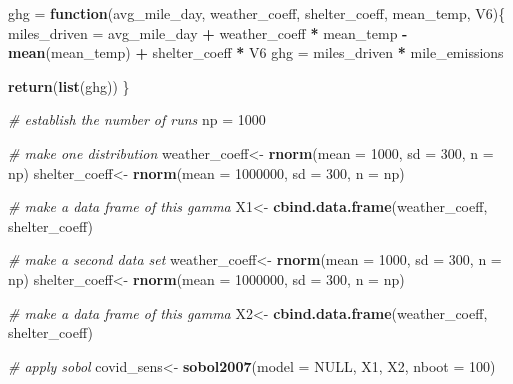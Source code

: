 \documentclass[]{article}
\newenvironment{Shaded}{\begin{snugshade}}{\end{snugshade}}
\newcommand{\KeywordTok}[1]{\textcolor[rgb]{0.13,0.29,0.53}{\textbf{#1}}}
\newcommand{\DataTypeTok}[1]{\textcolor[rgb]{0.13,0.29,0.53}{#1}}
\newcommand{\DecValTok}[1]{\textcolor[rgb]{0.00,0.00,0.81}{#1}}
\newcommand{\StringTok}[1]{\textcolor[rgb]{0.31,0.60,0.02}{#1}}
\newcommand{\CommentTok}[1]{\textcolor[rgb]{0.56,0.35,0.01}{\textit{#1}}}
\newcommand{\OtherTok}[1]{\textcolor[rgb]{0.56,0.35,0.01}{#1}}
\newcommand{\ControlFlowTok}[1]{\textcolor[rgb]{0.13,0.29,0.53}{\textbf{#1}}}
\newcommand{\OperatorTok}[1]{\textcolor[rgb]{0.81,0.36,0.00}{\textbf{#1}}}
\newcommand{\NormalTok}[1]{#1}
\begin{document}
\begin{Shaded}
\begin{Highlighting}[]
\NormalTok{ghg =}\StringTok{ }\ControlFlowTok{function}\NormalTok{(avg_mile_day, weather_coeff, shelter_coeff, mean_temp, V6)\{}
\NormalTok{  miles_driven =}\StringTok{ }\NormalTok{avg_mile_day }\OperatorTok{+}\StringTok{ }\NormalTok{weather_coeff }\OperatorTok{*}\StringTok{ }\NormalTok{mean_temp }\OperatorTok{-}\StringTok{ }\KeywordTok{mean}\NormalTok{(mean_temp) }\OperatorTok{+}\StringTok{ }\NormalTok{shelter_coeff }\OperatorTok{*}\StringTok{ }\NormalTok{V6}
\NormalTok{  ghg =}\StringTok{ }\NormalTok{miles_driven }\OperatorTok{*}\StringTok{ }\NormalTok{mile_emissions}
  
  \KeywordTok{return}\NormalTok{(}\KeywordTok{list}\NormalTok{(ghg))}
\NormalTok{\}}


\CommentTok{# establish the number of runs}
\NormalTok{np =}\StringTok{ }\DecValTok{1000}

\CommentTok{# make one distribution }
\NormalTok{weather_coeff<-}\StringTok{ }\KeywordTok{rnorm}\NormalTok{(}\DataTypeTok{mean =} \DecValTok{1000}\NormalTok{, }\DataTypeTok{sd =} \DecValTok{300}\NormalTok{, }\DataTypeTok{n =}\NormalTok{ np)}
\NormalTok{shelter_coeff<-}\StringTok{ }\KeywordTok{rnorm}\NormalTok{(}\DataTypeTok{mean =} \DecValTok{1000000}\NormalTok{, }\DataTypeTok{sd =} \DecValTok{300}\NormalTok{, }\DataTypeTok{n =}\NormalTok{ np)}

\CommentTok{# make a data frame of this gamma}
\NormalTok{X1<-}\StringTok{ }\KeywordTok{cbind.data.frame}\NormalTok{(weather_coeff, shelter_coeff)}

\CommentTok{# make a second data set}
\NormalTok{weather_coeff<-}\StringTok{ }\KeywordTok{rnorm}\NormalTok{(}\DataTypeTok{mean =} \DecValTok{1000}\NormalTok{, }\DataTypeTok{sd =} \DecValTok{300}\NormalTok{, }\DataTypeTok{n =}\NormalTok{ np)}
\NormalTok{shelter_coeff<-}\StringTok{ }\KeywordTok{rnorm}\NormalTok{(}\DataTypeTok{mean =} \DecValTok{1000000}\NormalTok{, }\DataTypeTok{sd =} \DecValTok{300}\NormalTok{, }\DataTypeTok{n =}\NormalTok{ np)}

\CommentTok{# make a data frame of this gamma}
\NormalTok{X2<-}\StringTok{ }\KeywordTok{cbind.data.frame}\NormalTok{(weather_coeff, shelter_coeff)}

\CommentTok{# apply sobol}
\NormalTok{covid_sens<-}\StringTok{ }\KeywordTok{sobol2007}\NormalTok{(}\DataTypeTok{model =} \OtherTok{NULL}\NormalTok{, X1, X2, }\DataTypeTok{nboot =} \DecValTok{100}\NormalTok{)}


\end{Highlighting}
\end{Shaded}
\end{document}
